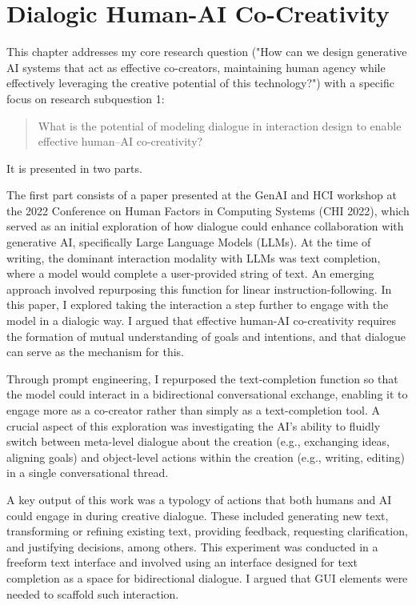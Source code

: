 \chapter [Dialogic co-creativity]{Dialogic Human-AI Co-Creativity} \label{c:tc4}

This chapter addresses my core research question ("How can we design generative AI systems that act as effective co-creators, maintaining human agency while effectively leveraging the creative potential of this technology?") with a specific focus on research subquestion 1:
\begin{quote}
What is the potential of modeling dialogue in interaction design to enable effective human–AI co-creativity?
\end{quote}
It is presented in two parts.

The first part consists of a paper presented at the GenAI and HCI workshop at the 2022 Conference on Human Factors in Computing Systems (CHI 2022), which served as an initial exploration of how dialogue could enhance collaboration with generative AI, specifically Large Language Models (LLMs). At the time of writing, the dominant interaction modality with LLMs was text completion, where a model would complete a user-provided string of text. An emerging approach involved repurposing this function for linear instruction-following. In this paper, I explored taking the interaction a step further to engage with the model in a dialogic way. I argued that effective human-AI co-creativity requires the formation of mutual understanding of goals and intentions, and that dialogue can serve as the mechanism for this.

Through prompt engineering, I repurposed the text-completion function so that the model could interact in a bidirectional conversational exchange, enabling it to engage more as a co-creator rather than simply as a text-completion tool. A crucial aspect of this exploration was investigating the AI's ability to fluidly switch between meta-level dialogue about the creation (e.g., exchanging ideas, aligning goals) and object-level actions within the creation (e.g., writing, editing) in a single conversational thread.

A key output of this work was a typology of actions that both humans and AI could engage in during creative dialogue. These included generating new text, transforming or refining existing text, providing feedback, requesting clarification, and justifying decisions, among others.
This experiment was conducted in a freeform text interface and involved using an interface designed for text completion as a space for bidirectional dialogue. I argued that GUI elements were needed to scaffold such interaction.

